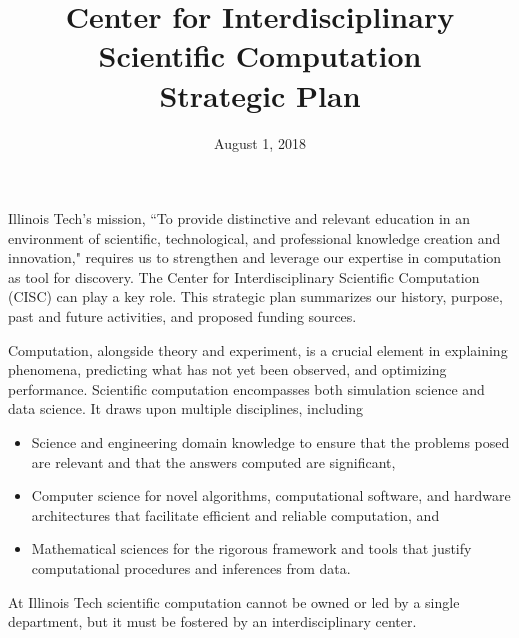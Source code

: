 \documentclass[12pt]{amsart}
\begin{document}
\title[Center for Interdisciplinary Scientific Computation Strategic Plan]{Center for Interdisciplinary Scientific Computation \\ Strategic Plan}
\date{August 1, 2018}
\maketitle


Illinois Tech's mission, ``To provide distinctive and relevant education in an environment of scientific, technological, and professional knowledge creation and innovation," requires us to strengthen and leverage our expertise in computation as tool for discovery.  The Center for Interdisciplinary Scientific Computation (CISC) can play a key role. This strategic plan  summarizes our history, purpose, past and future activities, and proposed funding sources.

Computation, alongside theory and experiment, is a crucial element in explaining phenomena, predicting what has not yet been observed, and optimizing performance.  Scientific computation encompasses both simulation science and data science. It draws upon multiple disciplines, including
\begin{itemize}
    \item Science and engineering domain knowledge to ensure that the problems posed are relevant and that the answers computed are significant,
    \item Computer science for novel algorithms, computational software, and hardware architectures that facilitate efficient and reliable computation, and
    \item Mathematical sciences for the rigorous framework and tools that justify computational procedures and inferences from data.
\end{itemize}
At Illinois Tech scientific computation cannot be owned or led by a single department, but it must be fostered by an interdisciplinary center.
\end{document}
